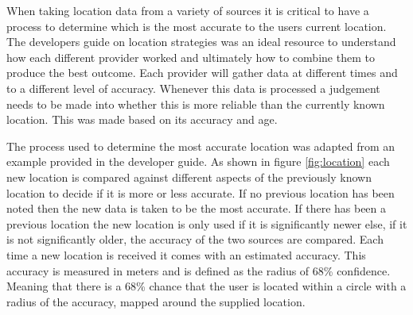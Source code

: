 When taking location data from a variety of sources it is critical to have a process to determine which is the most accurate to the users current location. The developers guide on location strategies\cite{location} was an ideal resource to understand how each different provider worked and ultimately how to combine them to produce the best outcome. Each provider will gather data at different times and to a different level of accuracy. Whenever this data is processed a judgement needs to be made into whether this is more reliable than the currently known location. This was made based on its accuracy and age.

The process used to determine the most accurate location was adapted from an example provided in the developer guide. As shown in figure \ref{fig:location} each new location is compared against different aspects of the previously known location to decide if it is more or less accurate. If no previous location has been noted then the new data is taken to be the most accurate. If there has been a previous location the new location is only used if it is significantly newer else, if it is not significantly older, the accuracy of the two sources are compared. Each time a new location is received it comes with an estimated accuracy. This accuracy is measured in meters and is defined as the radius of 68\% confidence\cite{location_accuracy}. Meaning that there is a 68\% chance that the user is located within a circle with a radius of the accuracy, mapped around the supplied location.

